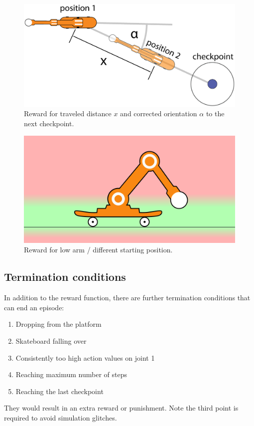 \documentclass[conference]{IEEEtran}
\begin{document}
\begin{figure}[!t]
  \centering
  \includegraphics[width=1\linewidth]{images/checkpoint_reward.eps}
  \caption{Reward for traveled distance $x$ and corrected orientation $\alpha$ to the next checkpoint.}
\label{fig:Reward_keep_line}
\end{figure}


\begin{figure}[!t]
  \centering
  \includegraphics[width=0.8\linewidth]{images/Reward_low_ball.jpg}
  \caption{Reward for low arm / different starting position.}
\label{fig:Reward_low_ball}
\end{figure}

\subsection{Termination conditions} \label{Termination_conditions}
In addition to the reward function, there are further termination conditions that can end an episode:


\begin{enumerate}[\IEEEsetlabelwidth{5}]
    \item Dropping from the platform
    \item Skateboard falling over
    \item Consistently too high action values on joint 1 
    \item Reaching maximum number of steps
    \item Reaching the last checkpoint
\end{enumerate}
 They would result in an extra reward or punishment. Note the third point is required to avoid simulation glitches.
\end{document}
